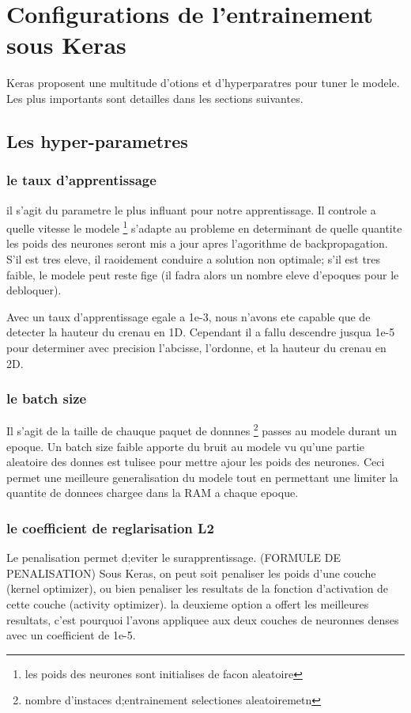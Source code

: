 \section{Configurations de l'entrainement sous Keras}
Keras proposent une multitude d'otions et d'hyperparatres pour tuner le modele. Les plus importants sont detailles dans les sections suivantes.

\subsection{Les hyper-parametres}

\subsubsection{le taux d'apprentissage}
il s'agit du parametre le plus influant pour notre apprentissage. Il controle a quelle vitesse le modele \footnote{les poids des neurones sont initialises de facon aleatoire} s'adapte au probleme en determinant de quelle quantite les poids des neurones seront mis a jour apres l'agorithme de backpropagation. S'il est tres eleve, il raoidement conduire a solution non optimale; s'il est tres faible, le modele peut reste fige (il fadra alors un nombre eleve d'epoques pour le debloquer).

Avec un taux d'apprentissage egale a 1e-3, nous n'avons ete capable que de detecter la hauteur du crenau en 1D. Cependant il a fallu descendre jusqua 1e-5 pour determiner avec precision l'abcisse, l'ordonne, et la hauteur du crenau en 2D.

\subsubsection{le batch size}
Il s'agit de la taille de chauque paquet de donnnes \footnote{nombre d'instaces d;entrainement selectiones aleatoiremetn} passes au modele durant un epoque. Un batch size faible apporte du bruit au modele vu qu'une partie aleatoire des donnes est tulisee pour mettre ajour les poids des neurones. Ceci permet une meilleure generalisation du modele tout en permettant une limiter la quantite de donnees chargee dans la RAM a chaque epoque.

\subsubsection{le coefficient de reglarisation L2}
Le penalisation permet d;eviter le surapprentissage. (FORMULE DE PENALISATION) Sous Keras, on peut soit penaliser les poids d'une couche (kernel optimizer), ou bien penaliser les resultats de la fonction d'activation de cette couche (activity optimizer). la deuxieme option a offert les meilleures resultats, c'est pourquoi l'avons appliquee aux deux couches de neuronnes denses avec un coefficient de 1e-5.

